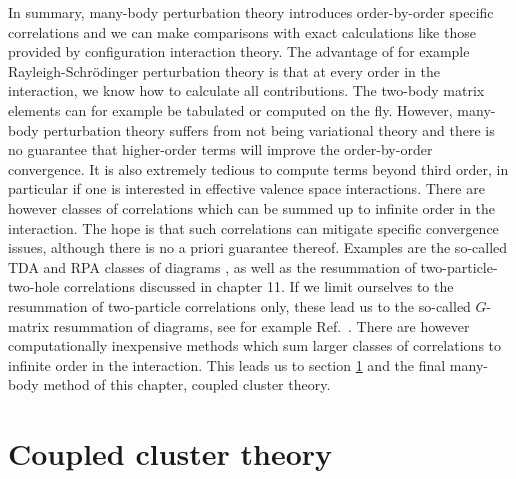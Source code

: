In summary, many-body perturbation theory introduces order-by-order
specific correlations and we can make comparisons with exact
calculations like those provided by configuration interaction theory.
The advantage of for example Rayleigh-Schr\"odinger perturbation
theory is that at every order in the interaction, we know how to
calculate all contributions. The two-body matrix elements can for example  be tabulated or
computed on the fly.  However, many-body perturbation theory suffers
from not being variational theory and there is no guarantee that
higher-order terms will improve the order-by-order convergence.  It is
also extremely tedious to compute terms beyond third order, in
particular if one is interested in effective valence space
interactions.  There are however classes of correlations which can be
summed up to infinite order in the interaction.  The hope is that such
correlations can mitigate specific convergence issues, although there
is no a priori guarantee thereof.  Examples are the so-called TDA and
RPA classes of diagrams \cite{blaizot,Ch11_Dickhoff2008,Ch11_Mattuck1992}, as well as the resummation
of two-particle-two-hole correlations discussed in chapter 11. If we limit ourselves to the
resummation of two-particle correlations only, these lead us to the
so-called $G$-matrix resummation of diagrams, see for example Ref.~\cite{day1967}.
There are however computationally inexpensive methods which
sum larger classes of correlations to infinite order in the
interaction. This leads us to section \ref{sec:chap8cctheory} and the final
many-body method of this chapter, coupled cluster theory. 


\section{Coupled cluster theory}\label{sec:chap8cctheory}
  
